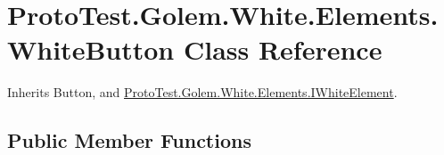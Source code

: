 \hypertarget{class_proto_test_1_1_golem_1_1_white_1_1_elements_1_1_white_button}{\section{Proto\-Test.\-Golem.\-White.\-Elements.\-White\-Button Class Reference}
\label{class_proto_test_1_1_golem_1_1_white_1_1_elements_1_1_white_button}
}


Inherits Button, and \hyperlink{interface_proto_test_1_1_golem_1_1_white_1_1_elements_1_1_i_white_element}{Proto\-Test.\-Golem.\-White.\-Elements.\-I\-White\-Element}.

\subsection*{Public Member Functions}
